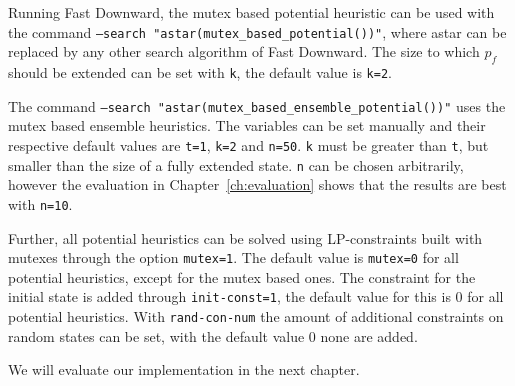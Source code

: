 Running Fast Downward, the mutex based potential heuristic can be used with the command \texttt{--search "astar(mutex\_based\_potential())"}, where astar can be replaced by any other search algorithm of Fast Downward.
The size to which $p_f$ should be extended can be set with \texttt{k}, the default value is \texttt{k=2}.

The command \texttt{--search "astar(mutex\_based\_ensemble\_potential())"} uses the mutex based ensemble heuristics.
The variables can be set manually and their respective default values are \texttt{t=1}, \texttt{k=2} and \texttt{n=50}.
\texttt{k} must be greater than \texttt{t}, but smaller than the size of a fully extended state.
\texttt{n} can be chosen arbitrarily, however the evaluation in Chapter~\ref{ch:evaluation} shows that the results are best with \texttt{n=10}.

Further, all potential heuristics can be solved using LP-constraints built with mutexes through the option \texttt{mutex=1}.
The default value is \texttt{mutex=0} for all potential heuristics, except for the mutex based ones.
The constraint for the initial state is added through \texttt{init-const=1}, the default value for this is $0$ for all potential heuristics.
With \texttt{rand-con-num} the amount of additional constraints on random states can be set, with the default value $0$ none are added.

We will evaluate our implementation in the next chapter.
